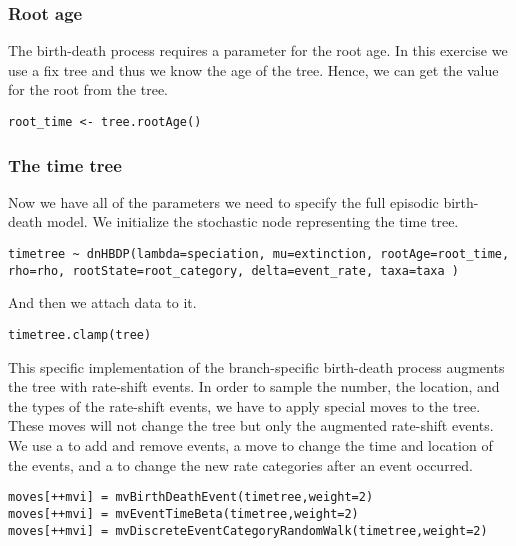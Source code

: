 \subsubsection{Root age}

The birth-death process requires a parameter for the root age.
In this exercise we use a fix tree and thus we know the age of the tree.
Hence, we can get the value for the root from the \citet{Springer2012} tree.
{\tt \begin{snugshade*}
\begin{lstlisting}
root_time <- tree.rootAge()
\end{lstlisting}
\end{snugshade*}}

\subsubsection{The time tree}

Now we have all of the parameters we need to specify the full episodic birth-death model. 
We initialize the stochastic node representing the time tree.
{\tt \begin{snugshade*}
\begin{lstlisting}
timetree ~ dnHBDP(lambda=speciation, mu=extinction, rootAge=root_time, rho=rho, rootState=root_category, delta=event_rate, taxa=taxa )
\end{lstlisting}
\end{snugshade*}}
And then we attach data to it.
{\tt \begin{snugshade*}
\begin{lstlisting}
timetree.clamp(tree)
\end{lstlisting}
\end{snugshade*}}

This specific implementation of the branch-specific birth-death process augments the tree with rate-shift events.
In order to sample the number, the location, and the types of the rate-shift events, we have to apply special moves to the tree.
These moves will not change the tree but only the augmented rate-shift events.
We use a  to add and remove events, a  move to change the time and location of the events, 
and a  to change the new rate categories after an event occurred.
{\tt \begin{snugshade*}
\begin{lstlisting}
moves[++mvi] = mvBirthDeathEvent(timetree,weight=2)
moves[++mvi] = mvEventTimeBeta(timetree,weight=2)
moves[++mvi] = mvDiscreteEventCategoryRandomWalk(timetree,weight=2)
\end{lstlisting}
\end{snugshade*}}

